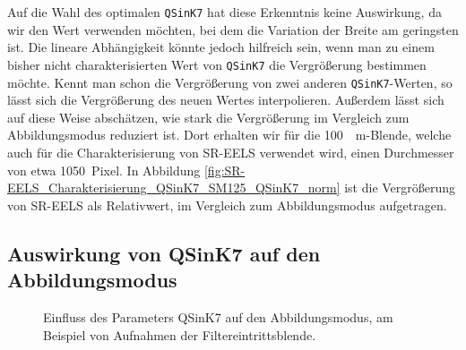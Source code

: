 \documentclass[
	paper=a4,				%
	twoside=true,			%
	BCOR=6mm,				%
	fontsize=12pt,			%
	pagesize=auto,			%
	numbers=noenddot,		%
	bibliography=totoc,		%
	draft=false
]{scrartcl}
\begin{document}
Auf die Wahl des optimalen \texttt{QSinK7} hat diese Erkenntnis keine Auswirkung, da wir den Wert verwenden möchten, bei dem die Variation der Breite am geringsten ist. Die lineare Abhängigkeit könnte jedoch hilfreich sein, wenn man zu einem bisher nicht charakterisierten Wert von \texttt{QSinK7} die Vergrößerung bestimmen möchte. Kennt man schon die Vergrößerung von zwei anderen \texttt{QSinK7}-Werten, so lässt sich die Vergrößerung des neuen Wertes interpolieren. Außerdem lässt sich auf diese Weise abschätzen, wie stark die Vergrößerung im Vergleich zum Abbildungsmodus reduziert ist. Dort erhalten wir für die \SI{100}{\mu\meter}-Blende, welche auch für die Charakterisierung von SR-EELS verwendet wird, einen Durchmesser von etwa \SI{1050}{Pixel}. In Abbildung \ref{fig:SR-EELS_Charakterisierung_QSinK7_SM125_QSinK7_norm} ist die Vergrößerung von SR-EELS als Relativwert, im Vergleich zum Abbildungsmodus aufgetragen.


\subsection{Auswirkung von QSinK7 auf den Abbildungsmodus}

\begin{figure}
	\centering
	\caption{Einfluss des Parameters QSinK7 auf den Abbildungsmodus, am Beispiel von Aufnahmen der Filtereintrittsblende.}
	\label{fig:fig:SR-EELS_Blende_QSinK7}
\end{figure}
\end{document}
